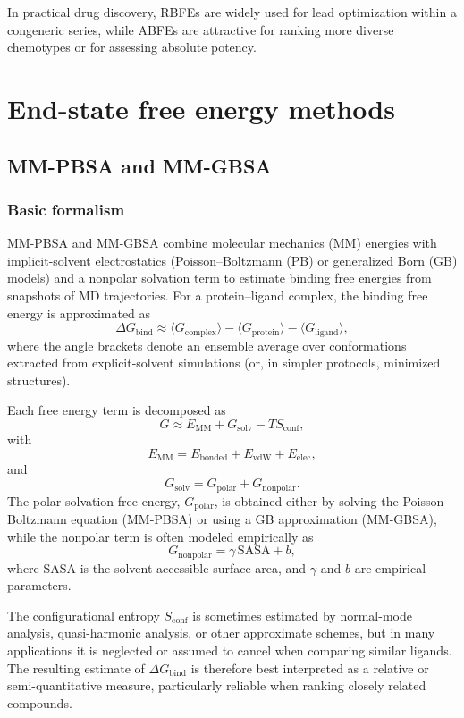 \documentclass[12pt]{article}
\begin{document}
In practical drug discovery, RBFEs are widely used for lead optimization within a congeneric series, while ABFEs are attractive for ranking more diverse chemotypes or for assessing absolute potency. 

\section{End-state free energy methods}

\subsection{MM-PBSA and MM-GBSA}

\subsubsection{Basic formalism}

MM-PBSA and MM-GBSA combine molecular mechanics (MM) energies with implicit-solvent electrostatics (Poisson--Boltzmann (PB) or generalized Born (GB) models) and a nonpolar solvation term to estimate binding free energies from snapshots of MD trajectories.\cite{CH10_kollman1993free,CH10_srinivasan1998mmpbsa,CH10_homeyer2012mmpbsa} 
For a protein--ligand complex, the binding free energy is approximated as
\[
\Delta G_\mathrm{bind} \approx 
\langle G_\mathrm{complex} \rangle 
- \langle G_\mathrm{protein} \rangle 
- \langle G_\mathrm{ligand} \rangle,
\]
where the angle brackets denote an ensemble average over conformations extracted from explicit-solvent simulations (or, in simpler protocols, minimized structures). 

Each free energy term is decomposed as
\[
G \approx E_\mathrm{MM} + G_\mathrm{solv} - TS_\mathrm{conf},
\]
with
\[
E_\mathrm{MM} = E_\mathrm{bonded} + E_\mathrm{vdW} + E_\mathrm{elec},
\]
and
\[
G_\mathrm{solv} = G_\mathrm{polar} + G_\mathrm{nonpolar}. 
\]
The polar solvation free energy, \(G_\mathrm{polar}\), is obtained either by solving the Poisson--Boltzmann equation (MM-PBSA) or using a GB approximation (MM-GBSA), while the nonpolar term is often modeled empirically as
\[
G_\mathrm{nonpolar} = \gamma\, \mathrm{SASA} + b,
\]
where SASA is the solvent-accessible surface area, and \(\gamma\) and \(b\) are empirical parameters. 

The configurational entropy \(S_\mathrm{conf}\) is sometimes estimated by normal-mode analysis, quasi-harmonic analysis, or other approximate schemes, but in many applications it is neglected or assumed to cancel when comparing similar ligands. 
The resulting estimate of \(\Delta G_\mathrm{bind}\) is therefore best interpreted as a relative or semi-quantitative measure, particularly reliable when ranking closely related compounds.\cite{CH10_homeyer2012mmpbsa} 
\end{document}
